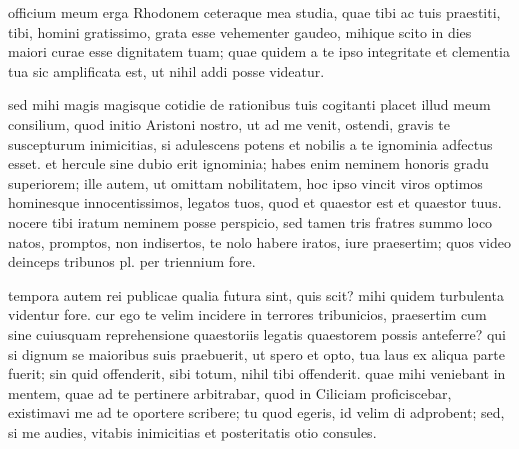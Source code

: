 


 officium meum erga Rhodonem ceteraque mea studia, quae tibi ac tuis praestiti, tibi, homini gratissimo, grata esse vehementer gaudeo, mihique scito in dies maiori curae esse dignitatem tuam; quae quidem a te ipso integritate et clementia tua sic amplificata est, ut nihil addi posse videatur.

 sed mihi magis magisque cotidie de rationibus tuis cogitanti placet illud meum consilium, quod initio Aristoni nostro, ut ad me venit, ostendi, gravis te suscepturum inimicitias, si adulescens potens et nobilis a te ignominia adfectus esset. et hercule sine dubio erit ignominia; habes enim neminem honoris gradu superiorem; ille autem, ut omittam nobilitatem, hoc ipso vincit viros optimos hominesque innocentissimos, legatos tuos, quod et quaestor est et quaestor tuus. nocere tibi iratum neminem posse perspicio, sed tamen tris fratres summo loco natos, promptos, non indisertos, te nolo habere iratos, iure praesertim; quos video deinceps tribunos pl. per triennium fore.

 tempora autem rei publicae qualia futura sint, quis scit? mihi quidem turbulenta videntur fore. cur ego te velim incidere in terrores tribunicios, praesertim cum sine cuiusquam reprehensione quaestoriis legatis quaestorem possis anteferre? qui si dignum se maioribus suis praebuerit, ut spero et opto, tua laus ex aliqua parte fuerit; sin quid offenderit, sibi totum, nihil tibi offenderit. quae mihi veniebant in mentem, quae ad te pertinere arbitrabar, quod in Ciliciam proficiscebar, existimavi me ad te oportere scribere; tu quod egeris, id velim di adprobent; sed, si me audies, vitabis inimicitias et posteritatis otio consules.
